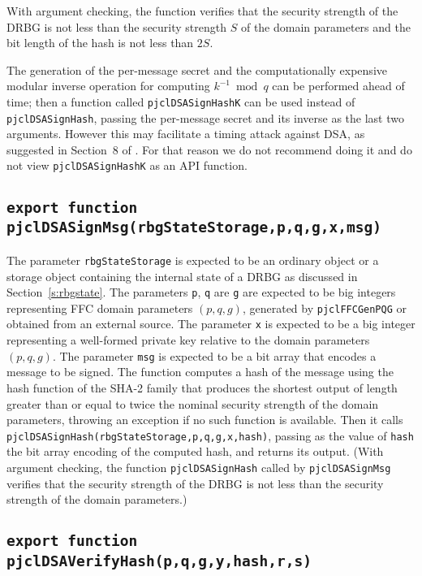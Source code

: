 \documentclass[12pt]{article}
\begin{document}
With argument checking, the function verifies that the security strength of the DRBG
is not less than the security strength $S$ of the domain parameters and the 
bit length of the hash is not less than $2S$.

The generation of the per-message secret and 
the computationally expensive modular inverse operation for computing 
$k^{-1} \bmod q$ can be performed ahead of time; then a function called
{\tt pjclDSASignHashK} can be used instead of {\tt pjclDSASignHash},
passing the per-message secret and its inverse as the last two arguments.
However this may facilitate a timing
attack against DSA, as suggested in Section~8 of \cite{Kocher1996}.
For that reason we do not recommend doing it and do not view {\tt pjclDSASignHashK}
as an API function.

\subsection{\tt export function pjclDSASignMsg(rbgStateStorage,p,q,g,x,msg)}

The parameter {\tt rbgStateStorage} is expected to be an ordinary
object or a storage object containing the internal state of a DRBG 
as discussed in Section~\ref{s:rbgstate}.
The parameters {\tt p}, {\tt q} are {\tt g}
are expected to be big integers representing FFC domain parameters $(p,q,g)$,
generated by {\tt pjclFFCGenPQG} or obtained from an external source.
The parameter {\tt x} is expected to be a big integer representing a well-formed private key
relative to the domain parameters $(p,q,g)$.
The parameter {\tt msg} is expected to be a bit array that encodes a message
to be signed.  The function computes a hash of the message using 
the hash function of the SHA-2 family
that produces the shortest output of length greater than or equal to 
twice the nominal security strength of the domain
parameters, throwing an exception if no such function is available.  Then it calls
{\tt pjclDSASignHash(rbgStateStorage,p,q,g,x,hash)}, passing as the value of {\tt hash}
the bit array encoding of the computed hash, and returns its output.
(With argument checking, the function {\tt pjclDSASignHash} called by
{\tt pjclDSASignMsg} verifies that the security strength of the DRBG
is not less than the security strength of the domain parameters.)

\subsection{\tt export function pjclDSAVerifyHash(p,q,g,y,hash,r,s)}
\end{document}
